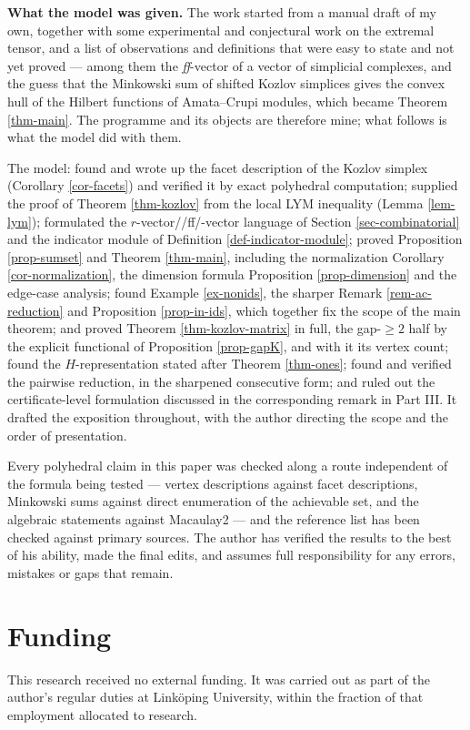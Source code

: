 \documentclass[11pt, a4paper, abstract=yes]{scrartcl}
\theoremstyle{definition}
\theoremstyle{remark}
\theoremstyle{plain}
\begin{document}
\textbf{What the model was given.} The work started from a manual draft of my own, together with some
experimental and conjectural work on the extremal tensor, and a list of observations and
definitions that were easy to state and not yet proved --- among them the \emph{ff}-vector of a vector
of simplicial complexes, and the guess that the Minkowski sum of shifted Kozlov simplices gives the
convex hull of the Hilbert functions of Amata--Crupi modules, which became Theorem \ref{thm-main}.
The programme and its objects are therefore mine; what follows is what the model did with them.

The model: found and wrote up the facet description of the Kozlov simplex (Corollary \ref{cor-facets})
and verified it by exact polyhedral computation; supplied the proof of Theorem \ref{thm-kozlov} from the
local LYM inequality (Lemma \ref{lem-lym}); formulated the \(r\)-vector//ff/-vector language of
Section \ref{sec-combinatorial} and the indicator module of Definition \ref{def-indicator-module}; proved
Proposition \ref{prop-sumset} and Theorem \ref{thm-main}, including the normalization
Corollary \ref{cor-normalization}, the dimension formula Proposition \ref{prop-dimension} and the edge-case
analysis; found Example \ref{ex-nonids}, the sharper Remark \ref{rem-ac-reduction} and
Proposition \ref{prop-in-ids}, which together fix the scope of the main theorem; and proved Theorem \ref{thm-kozlov-matrix} in full, the
gap-\(\ge2\) half by the explicit functional of Proposition \ref{prop-gapK}, and with it
its vertex count; found the \(H\)-representation stated after Theorem \ref{thm-ones}; found and
verified the pairwise reduction, in the sharpened consecutive form; and ruled out the
certificate-level formulation discussed in the corresponding remark in Part III. It
drafted the exposition throughout, with the author directing the scope and the order of
presentation.

Every polyhedral claim in this paper was checked along a route independent of the formula being
tested --- vertex descriptions against facet descriptions, Minkowski sums against direct enumeration
of the achievable set, and the algebraic statements against Macaulay2 --- and the reference list has
been checked against primary sources. The author has verified the results to the best of his ability,
made the final edits, and assumes full responsibility for any errors, mistakes or gaps that remain.
\section*{Funding}
\label{sec:org0d907ee}
This research received no external funding. It was carried out as part of the author's regular duties
at Linköping University, within the fraction of that employment allocated to research.
\end{document}
